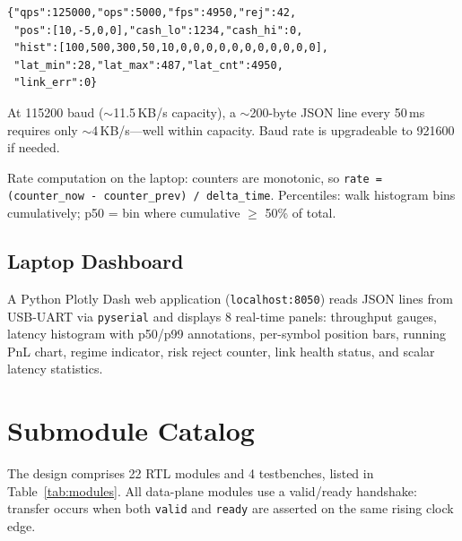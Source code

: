 \documentclass[conference]{IEEEtran}
\begin{document}
\begin{lstlisting}
{"qps":125000,"ops":5000,"fps":4950,"rej":42,
 "pos":[10,-5,0,0],"cash_lo":1234,"cash_hi":0,
 "hist":[100,500,300,50,10,0,0,0,0,0,0,0,0,0,0,0],
 "lat_min":28,"lat_max":487,"lat_cnt":4950,
 "link_err":0}
\end{lstlisting}

At 115200 baud ($\sim$11.5\,KB/s capacity), a $\sim$200-byte JSON line every 50\,ms requires only $\sim$4\,KB/s---well within capacity. Baud rate is upgradeable to 921600 if needed.

Rate computation on the laptop: counters are monotonic, so \texttt{rate = (counter\_now - counter\_prev) / delta\_time}. Percentiles: walk histogram bins cumulatively; p50 = bin where cumulative $\geq$ 50\% of total.

\subsection{Laptop Dashboard}

A Python Plotly Dash web application (\texttt{localhost:8050}) reads JSON lines from USB-UART via \texttt{pyserial} and displays 8 real-time panels: throughput gauges, latency histogram with p50/p99 annotations, per-symbol position bars, running PnL chart, regime indicator, risk reject counter, link health status, and scalar latency statistics.

\section{Submodule Catalog}

The design comprises 22 RTL modules and 4 testbenches, listed in Table~\ref{tab:modules}. All data-plane modules use a valid/ready handshake: transfer occurs when both \texttt{valid} and \texttt{ready} are asserted on the same rising clock edge.
\end{document}
